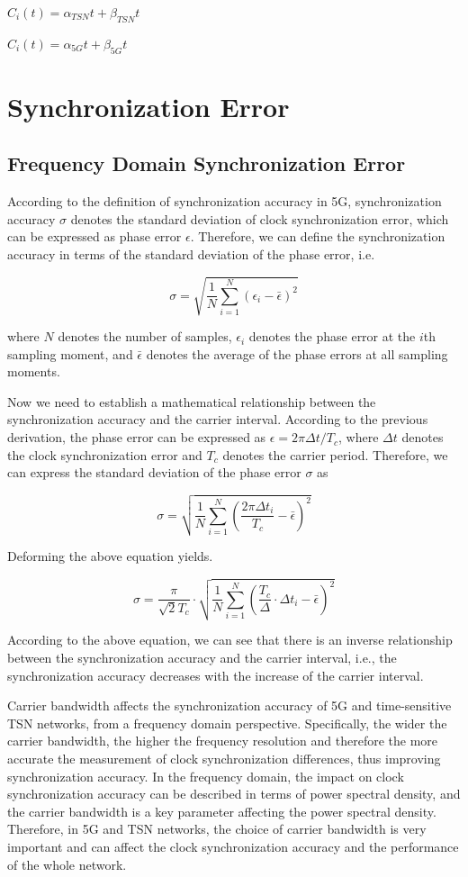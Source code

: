 \documentclass[english]{cccconf}
\begin{document}
$C_i(t) = \alpha_{TSN}t + \beta _{TSN}t$ 

$C_i(t) = \alpha_{5G}t + \beta _{5G}t$
\section{Synchronization Error}

\subsection{Frequency Domain Synchronization Error}

According to the definition of synchronization accuracy in 5G, synchronization accuracy $\sigma$ denotes the standard deviation of clock synchronization error, which can be expressed as phase error $\epsilon$. Therefore, we can define the synchronization accuracy in terms of the standard deviation of the phase error, i.e.

$$\sigma = \sqrt{\frac{1}{N}\sum_{i=1}^N(\epsilon_i - \bar{\epsilon})^2}$$

where $N$ denotes the number of samples, $\epsilon_i$ denotes the phase error at the $i$th sampling moment, and $\bar{\epsilon}$ denotes the average of the phase errors at all sampling moments.

Now we need to establish a mathematical relationship between the synchronization accuracy and the carrier interval. According to the previous derivation, the phase error can be expressed as $\epsilon = 2\pi\Delta t / T_c$, where $\Delta t$ denotes the clock synchronization error and $T_c$ denotes the carrier period. Therefore, we can express the standard deviation of the phase error $\sigma$ as

$$\sigma = \sqrt{\frac{1}{N}\sum_{i=1}^N\left(\frac{2\pi\Delta t_i}{T_c} - \bar{\epsilon}\right)^2}$$

Deforming the above equation yields.

$$\sigma = \frac{\pi}{\sqrt{2}T_c}\cdot\sqrt{\frac{1}{N}\sum_{i=1}^N\left(\frac{T_c}{\Delta}\cdot\Delta t_i - \bar{\epsilon}\right)^2}$$ 

According to the above equation, we can see that there is an inverse relationship between the synchronization accuracy and the carrier interval, i.e., the synchronization accuracy decreases with the increase of the carrier interval.

Carrier bandwidth affects the synchronization accuracy of 5G and time-sensitive TSN networks, from a frequency domain perspective. Specifically, the wider the carrier bandwidth, the higher the frequency resolution and therefore the more accurate the measurement of clock synchronization differences, thus improving synchronization accuracy. In the frequency domain, the impact on clock synchronization accuracy can be described in terms of power spectral density, and the carrier bandwidth is a key parameter affecting the power spectral density. Therefore, in 5G and TSN networks, the choice of carrier bandwidth is very important and can affect the clock synchronization accuracy and the performance of the whole network.
\end{document}
